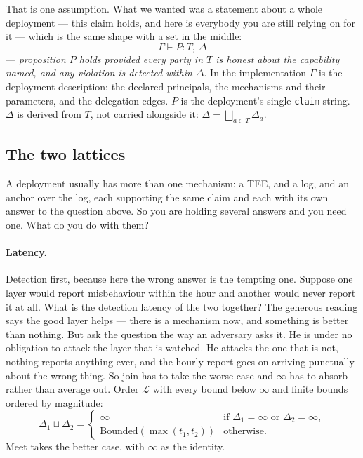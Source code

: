 \documentclass[11pt]{article}
\newcommand{\Never}{\infty}
\begin{document}
That is one assumption. What we wanted was a statement about a whole
deployment --- this claim holds, and here is everybody you are still relying
on for it --- which is the same shape with a set in the middle:
\begin{equation}
\Gamma \vdash P : T,\ \Delta
\end{equation}
--- \emph{proposition $P$ holds provided every party in $T$ is honest about
the capability named, and any violation is detected within $\Delta$}. In the
implementation $\Gamma$ is the deployment description: the declared
principals, the mechanisms and their parameters, and the delegation edges. $P$
is the deployment's single \texttt{claim} string. $\Delta$ is derived from
$T$, not carried alongside it: $\Delta = \bigsqcup_{a \in T} \Delta_a$.

\subsection{The two lattices}

A deployment usually has more than one mechanism: a TEE, and a log, and an
anchor over the log, each supporting the same claim and each with its own
answer to the question above. So you are holding several answers and you need
one. What do you do with them?

\paragraph{Latency.} Detection first, because here the wrong answer is the
tempting one. Suppose one layer would report misbehaviour within the hour and
another would never report it at all. What is the detection latency of the
two together? The generous reading says the good layer helps --- there is a
mechanism now, and something is better than nothing. But ask the question the
way an adversary asks it. He is under no obligation to attack the layer that
is watched. He attacks the one that is not, nothing reports anything ever,
and the hourly report goes on arriving punctually about the wrong thing. So
join has to take the worse case and $\Never$ has to absorb rather than
average out. Order $\mathcal{L}$ with every bound below $\Never$ and finite
bounds ordered by magnitude:
\begin{equation}
\Delta_1 \sqcup \Delta_2 =
\begin{cases}
\Never & \text{if } \Delta_1 = \Never \text{ or } \Delta_2 = \Never,\\
\mathrm{Bounded}(\max(t_1, t_2)) & \text{otherwise.}
\end{cases}
\end{equation}
Meet takes the better case, with $\Never$ as the identity.
\end{document}
